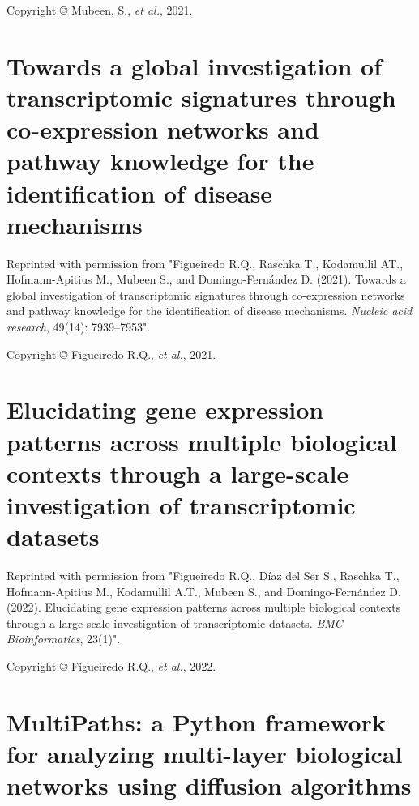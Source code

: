 \noindent
Copyright © Mubeen, S., \textit{et al.}, 2021.





\section{Towards a global investigation of transcriptomic signatures through co-expression networks and pathway knowledge for the identification of disease mechanisms}
\label{ap:coxpath}

\vspace*{2cm}

\noindent
Reprinted with permission from "Figueiredo R.Q., Raschka T., Kodamullil AT., Hofmann-Apitius M., Mubeen S.\textsuperscript{\textdagger}, and Domingo-Fern\'{a}ndez D.\textsuperscript{\textdagger} (2021). Towards a global investigation of transcriptomic signatures through co-expression networks and pathway knowledge for the identification of disease mechanisms. \textit{Nucleic acid research}, 49(14): 7939–7953".

\noindent
Copyright © Figueiredo R.Q., \textit{et al.}, 2021.





\section{Elucidating gene expression patterns across multiple biological contexts through a large-scale investigation of transcriptomic datasets}
\label{ap:contnext}

\vspace*{2cm}

\noindent
Reprinted with permission from "Figueiredo R.Q., Díaz del Ser S., Raschka T., Hofmann-Apitius M., Kodamullil A.T., Mubeen S.\textsuperscript{\textdagger}, and Domingo-Fern\'{a}ndez D.\textsuperscript{\textdagger} (2022). Elucidating gene expression patterns across multiple biological contexts through a large-scale investigation of transcriptomic datasets. \textit{BMC Bioinformatics}, 23(1)".

\noindent
Copyright © Figueiredo R.Q., \textit{et al.}, 2022.


 


\section{MultiPaths: a Python framework for analyzing multi-layer biological networks using diffusion algorithms}
\label{ap:multipaths}

